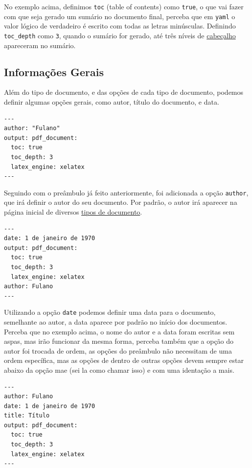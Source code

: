 \documentclass[
]{book}
\begin{document}
No exemplo acima, definimos \texttt{toc} (table of contents) como \texttt{true}, o que vai fazer com que seja gerado um sumário no documento final, perceba que em \texttt{yaml} o valor lógico de verdadeiro é escrito com todas as letras minúsculas. Definindo \texttt{toc\_depth} como \texttt{3}, quando o sumário for gerado, até três níveis de \protect\hyperlink{cabeuxe7alhos}{cabeçalho} apareceram no sumário.

\hypertarget{informauxe7uxf5es-gerais}{%
\subsection{Informações Gerais}\label{informauxe7uxf5es-gerais}}

Além do tipo de documento, e das opções de cada tipo de documento, podemos definir algumas opções gerais, como autor, título do documento, e data.

\begin{verbatim}
---
author: "Fulano"
output: pdf_document:
  toc: true
  toc_depth: 3
  latex_engine: xelatex
---
\end{verbatim}

Seguindo com o preâmbulo já feito anteriormente, foi adicionada a opção \texttt{author}, que irá definir o autor do seu documento. Por padrão, o autor irá aparecer na página inicial de diversos \protect\hyperlink{possuxedveis-tipos-de-outputs}{tipos de documento}.

\begin{verbatim}
---
date: 1 de janeiro de 1970
output: pdf_document:
  toc: true
  toc_depth: 3
  latex_engine: xelatex
author: Fulano
---
\end{verbatim}

Utilizando a opção \texttt{date} podemos definir uma data para o documento, semelhante ao autor, a data aparece por padrão no início dos documentos.
Perceba que no exemplo acima, o nome do autor e a data foram escritas sem aspas, mas irão funcionar da mesma forma, perceba também que a opção do autor foi trocada de ordem, as opções do preâmbulo não necessitam de uma ordem específica, mas as opções de dentro de outras opções devem sempre estar abaixo da opção mae (sei la como chamar isso) e com uma identação a mais.

\begin{verbatim}
---
author: Fulano
date: 1 de janeiro de 1970
title: Título
output: pdf_document:
  toc: true
  toc_depth: 3
  latex_engine: xelatex
---
\end{verbatim}
\end{document}
